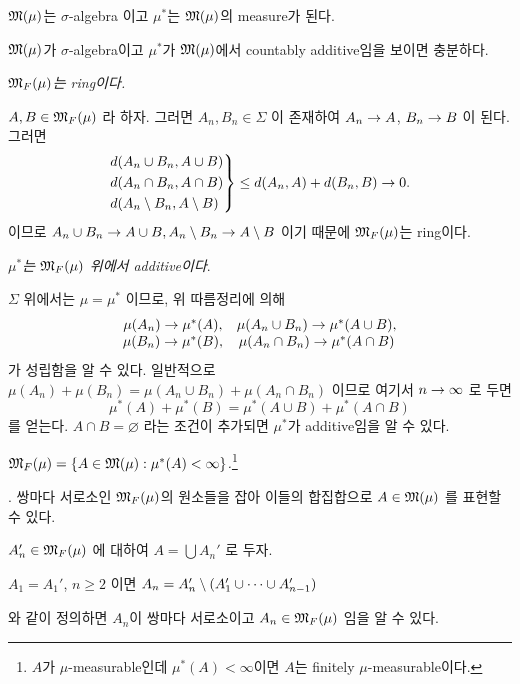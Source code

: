  \(\mathfrak{M}(\mu)\)는 \(\sigma\)-algebra 이고 \(\mu^\ast\)는 \(\mathfrak{M}(\mu)\)의 measure가 된다.

\pf \(\mathfrak{M}(\mu)\)가 \(\sigma\)-algebra이고 \(\mu^\ast\)가 \(\mathfrak{M}(\mu)\)에서 countably additive임을 보이면 충분하다.

 \textit{\(\mathfrak{M}_F(\mu)\)는 ring이다.}

\(A, B \in \mathfrak{M}_F(\mu)\) 라 하자. 그러면 \(A_n, B_n \in \Sigma\) 이 존재하여 \(A_n \rightarrow A\), \(B_n \rightarrow B\) 이 된다. 그러면
\[
    \begin{rcases}
        d(A_n \cup B_n, A \cup B) \\ d(A_n \cap B_n, A \cap B) \\ d(A_n \setminus B_n, A \setminus B)
    \end{rcases} \leq d(A_n, A) + d(B_n, B) \rightarrow 0.
\]
이므로 \(A_n \cup B_n \rightarrow A \cup B, A_n \setminus B_n \rightarrow A\setminus B\) 이기 때문에 \(\mathfrak{M}_F(\mu)\)는 ring이다.

 \textit{\(\mu^\ast\)는 \(\mathfrak{M}_F(\mu)\) 위에서 additive이다}.

\(\Sigma\) 위에서는 \(\mu = \mu^\ast\) 이므로, 위 따름정리에 의해
\[
    \begin{matrix}
        \mu(A_n) \rightarrow \mu^\ast(A), & \mu(A_n\cup B_n) \rightarrow \mu^\ast(A\cup B), \\
        \mu(B_n) \rightarrow \mu^\ast(B), & \mu(A_n\cap B_n) \rightarrow \mu^\ast(A\cap B)
    \end{matrix}
\]
가 성립함을 알 수 있다. 일반적으로 \(\mu(A_n) + \mu(B_n) = \mu(A_n \cup B_n) + \mu(A_n \cap B_n)\) 이므로 여기서 \(n \rightarrow \infty\) 로 두면
\[
    \mu^\ast(A) + \mu^\ast(B) = \mu^\ast(A\cup B) + \mu^\ast(A \cap B)
\]
를 얻는다. \(A \cap B = \varnothing\) 라는 조건이 추가되면 \(\mu^\ast\)가 additive임을 알 수 있다.

 \textit{\(\mathfrak{M}_F(\mu) = \{A \in \mathfrak{M}(\mu) : \mu^\ast(A) < \infty\}\).}\footnote{\(A\)가 \(\mu\)-measurable인데 \(\mu^\ast(A) < \infty\)이면 \(A\)는 finitely \(\mu\)-measurable이다.}

\quad \claim. 쌍마다 서로소인 \(\mathfrak{M}_F(\mu)\)의 원소들을 잡아 이들의 합집합으로 \(A \in \mathfrak{M}(\mu)\) 를 표현할 수 있다.

\quad \pf \(A_n' \in \mathfrak{M}_F(\mu)\) 에 대하여 \(A = \bigcup A_n'\) 로 두자.
\begin{center}
    \(A_1 = A_1'\), \(n \geq 2\) 이면 \(A_n = A_n' \setminus (A_1'\cup \cdots \cup A_{n-1}')\)
\end{center}
와 같이 정의하면 \(A_n\)이 쌍마다 서로소이고 \(A_n \in \mathfrak{M}_F(\mu)\) 임을 알 수 있다.

